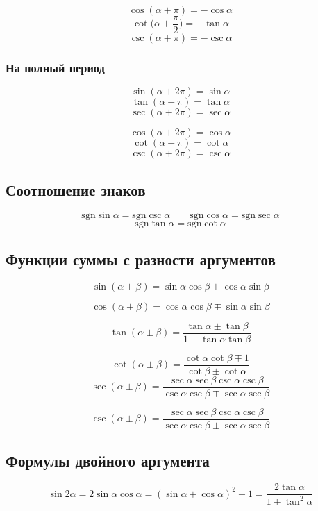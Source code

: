 \documentclass[
  letterpaper,
  DIV=11,
  numbers=noendperiod]{scrreprt}
\theoremstyle{definition}
\theoremstyle{remark}
\begin{document}
\[\cos (\alpha + \pi) = -\cos \alpha\]
\[\cot \Big(\alpha + \frac{\pi}{2}\Big) = -\tan \alpha\]
\[\csc (\alpha + \pi) = -\csc \alpha\]

\subsubsection{На полный период}\label{trig_shift_by_full}

\[\sin (\alpha + 2\pi) = \sin \alpha\]
\[\tan (\alpha + \pi) = \tan \alpha\]
\[\sec (\alpha + 2\pi) = \sec \alpha\]

\[\cos (\alpha + 2\pi) = \cos \alpha\]
\[\cot (\alpha + \pi) = \cot \alpha\]
\[\csc (\alpha + 2\pi) = \csc \alpha\]

\subsection{Соотношение знаков}\label{trig_sgn}

\[
\text{sgn}\sin \alpha = \text{sgn}\csc \alpha \qquad \text{sgn}\cos \alpha = \text{sgn}\sec \alpha
\] \[
\text{sgn}\tan \alpha = \text{sgn}\cot \alpha
\]

\subsection{Функции суммы с разности аргументов}\label{trig_angle_sum}

\[
\sin (\alpha \pm \beta) = \sin \alpha \cos \beta \pm \cos \alpha \sin \beta
\]

\[
\cos (\alpha \pm \beta) = \cos \alpha \cos \beta \mp \sin \alpha \sin \beta
\]

\[
\tan (\alpha \pm \beta) = \frac{\tan \alpha \pm \tan \beta}{1 \mp \tan \alpha \tan \beta}
\]

\[
\cot (\alpha \pm \beta) = \frac{\cot \alpha \cot \beta \mp 1}{\cot \beta \pm \cot \alpha}
\] \[
\sec (\alpha \pm \beta) = \frac{\sec \alpha \sec \beta \csc \alpha \csc \beta}{\csc \alpha \csc \beta \mp \sec \alpha \sec \beta}
\]

\[
\csc (\alpha \pm \beta) = \frac{\sec \alpha \sec \beta \csc \alpha \csc \beta}{\sec \alpha \csc \beta \pm \sec \alpha \sec \beta}
\]

\subsection{Формулы двойного аргумента}\label{trig_double_arg}

\[
\sin 2\alpha = 2\sin \alpha \cos \alpha = (\sin \alpha + \cos \alpha)^2 -1 = \frac{2\tan \alpha}{1 + \tan^2 \alpha}
\]
\end{document}
